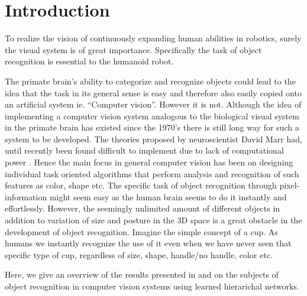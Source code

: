 \section{Introduction}
\label{sec:introduction}
To realize the vision of continuously expanding human abilities in robotics,
surely the visual system is of great importance.
Specifically the task of object recognition is essential to the humanoid robot.

The primate brain's ability to categorize and recognize objects could lead to
the idea that the task in its general sense is easy and therefore also easily
copied onto an artificial system ie. “Computer vision”. However it is not.
Although the idea of implementing a computer vision system analogous to
the biological visual system in the primate brain has existed since the 1970's
there is still long way for such a system to be developed.
The theories proposed by neuroscientist David Marr had,
until recently been found difficult to implement due to lack of computational power \citep{kruger2013deep}.
Hence the main focus in general computer vision has been on designing individual
task oriented algorithms that perform analysis and recognition of such features as color, shape etc.
The specific task of object recognition through pixel-information might seem
easy as the human brain seems to do it instantly and effortlessly.
However, the seemingly unlimited amount of different objects in addition to variation of size
and posture in the 3D space is a great obstacle in the development of object recognition.
Imagine the simple concept of a cup. As humans we instantly recognize the use of it
even when we have never seen that specific type of cup,
regardless of size, shape, handle/no handle, color etc.

Here, we give an overview of the results presented in \citet{kruger2013deep} and \citet{fidler2009learning}
on the subjects of object recognition in computer vision systems using learned hierarichal networks.
